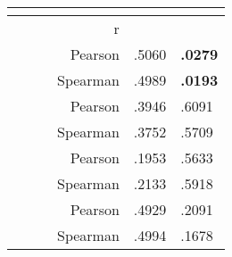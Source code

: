 \begin{table}
    \centering
    \begin{ThreePartTable}
        
    \begin{tabularx}{\textwidth}{RRRRll}
         \\
    \toprule
     &  &  & r &  &  \\  
    \midrule
     &  &  & Pearson & .5060 & \textbf{.0279} \\  
    &  &  & Spearman & .4989 & \textbf{.0193}   \\  
    \midrule
     &  &  & Pearson & .3946 & .6091 \\  
    &  &  & Spearman & .3752 & .5709 \\  
    \midrule
     &  &  & Pearson & .1953 & .5633 \\  
    &  &  & Spearman & .2133 & .5918 \\ 
    
     
     &  &  & Pearson & .4929 & .2091 \\  
    &  &  & Spearman & .4994 & .1678 \\  
    

\end{tabularx}
\end{ThreePartTable}
\end{table}
